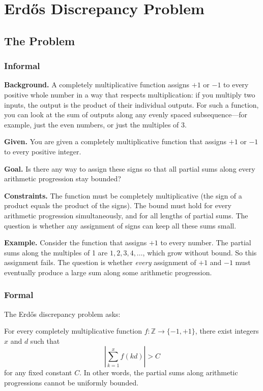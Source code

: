 \let\LocalMacro\relax

\chapter{Erdős Discrepancy Problem}

\section{The Problem}

\subsection{Informal}

\textbf{Background.} A completely multiplicative function assigns $+1$ or $-1$ to every positive whole number in a way that respects multiplication: if you multiply two inputs, the output is the product of their individual outputs. For such a function, you can look at the sum of outputs along any evenly spaced subsequence---for example, just the even numbers, or just the multiples of 3.

\textbf{Given.} You are given a completely multiplicative function that assigns $+1$ or $-1$ to every positive integer.

\textbf{Goal.} Is there any way to assign these signs so that all partial sums along every arithmetic progression stay bounded?

\textbf{Constraints.} The function must be completely multiplicative (the sign of a product equals the product of the signs). The bound must hold for every arithmetic progression simultaneously, and for all lengths of partial sums. The question is whether any assignment of signs can keep all these sums small.

\textbf{Example.} Consider the function that assigns $+1$ to every number. The partial sums along the multiples of 1 are $1, 2, 3, 4, \ldots$, which grow without bound. So this assignment fails. The question is whether \emph{every} assignment of $+1$ and $-1$ must eventually produce a large sum along some arithmetic progression.

\subsection{Formal}
The Erd\H{o}s discrepancy problem asks:
\begin{conjecture}[Erd\H{o}s, 1957]
For every completely multiplicative function $f: \mathbb{Z} \to \{-1, +1\}$, there exist integers $x$ and $d$ such that
\[
\left| \sum_{k=1}^{x} f(kd) \right| > C
\]
for any fixed constant $C$. In other words, the partial sums along arithmetic progressions cannot be uniformly bounded.
\end{conjecture}

